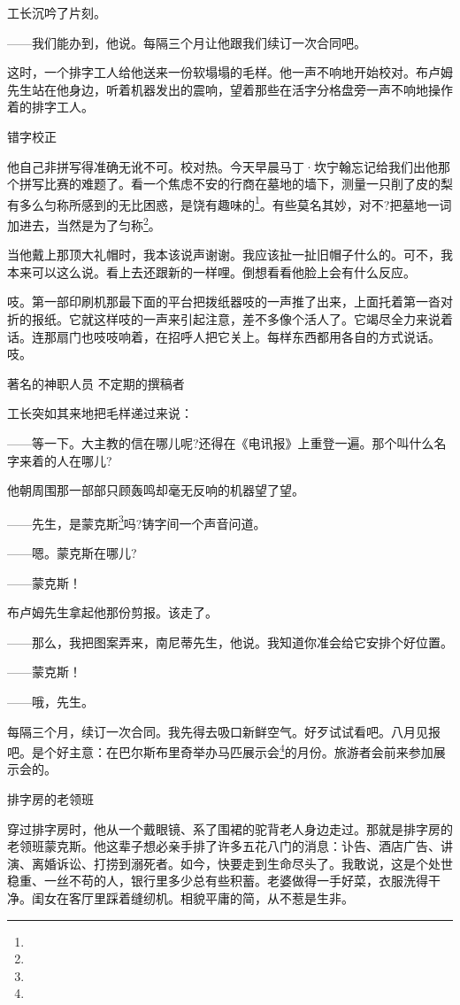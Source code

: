 \par 工长沉吟了片刻。
\par ——我们能办到，他说。每隔三个月让他跟我们续订一次合同吧。
\par 这时，一个排字工人给他送来一份软塌塌的毛样。他一声不响地开始校对。布卢姆先生站在他身边，听着机器发出的震响，望着那些在活字分格盘旁一声不响地操作着的排字工人。
\par 错字校正
\par 他自己非拼写得准确无讹不可。校对热。今天早晨马丁·坎宁翰忘记给我们出他那个拼写比赛的难题了。看一个焦虑不安的行商在墓地的墙下，测量一只削了皮的梨有多么匀称所感到的无比困惑，是饶有趣味的\footnote{}。有些莫名其妙，对不?把墓地一词加进去，当然是为了匀称\footnote{}。
\par 当他戴上那顶大礼帽时，我本该说声谢谢。我应该扯一扯旧帽子什么的。可不，我本来可以这么说。看上去还跟新的一样哩。倒想看看他脸上会有什么反应。
\par 吱。第一部印刷机那最下面的平台把拨纸器吱的一声推了出来，上面托着第一沓对折的报纸。它就这样吱的一声来引起注意，差不多像个活人了。它竭尽全力来说着话。连那扇门也吱吱响着，在招呼人把它关上。每样东西都用各自的方式说话。吱。
\par 著名的神职人员 不定期的撰稿者
\par 工长突如其来地把毛样递过来说：
\par ——等一下。大主教的信在哪儿呢?还得在《电讯报》上重登一遍。那个叫什么名字来着的人在哪儿?
\par 他朝周围那一部部只顾轰鸣却毫无反响的机器望了望。
\par ——先生，是蒙克斯\footnote{}吗?铸字间一个声音问道。
\par ——嗯。蒙克斯在哪儿?
\par ——蒙克斯！
\par 布卢姆先生拿起他那份剪报。该走了。
\par ——那么，我把图案弄来，南尼蒂先生，他说。我知道你准会给它安排个好位置。
\par ——蒙克斯！
\par ——哦，先生。
\par 每隔三个月，续订一次合同。我先得去吸口新鲜空气。好歹试试看吧。八月见报吧。是个好主意：在巴尔斯布里奇举办马匹展示会\footnote{}的月份。旅游者会前来参加展示会的。
\par 排字房的老领班
\par 穿过排字房时，他从一个戴眼镜、系了围裙的驼背老人身边走过。那就是排字房的老领班蒙克斯。他这辈子想必亲手排了许多五花八门的消息：讣告、酒店广告、讲演、离婚诉讼、打捞到溺死者。如今，快要走到生命尽头了。我敢说，这是个处世稳重、一丝不苟的人，银行里多少总有些积蓄。老婆做得一手好菜，衣服洗得干净。闺女在客厅里踩着缝纫机。相貌平庸的简，从不惹是生非。
